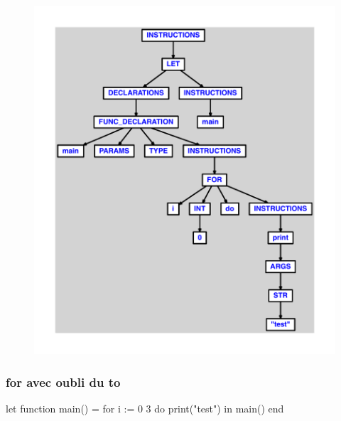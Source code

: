 \documentclass{article}
\begin{document}
\begin{figure}[H]\centering\includegraphics[max width=\textwidth]{ast/ast_190.pdf}\end{figure}\subsubsection{for avec oubli du to}
\begin{verbatimtab}
let
	function main() =
		for i := 0 3 do
			print("test")
in main() end
\end{verbatimtab}
\end{document}
